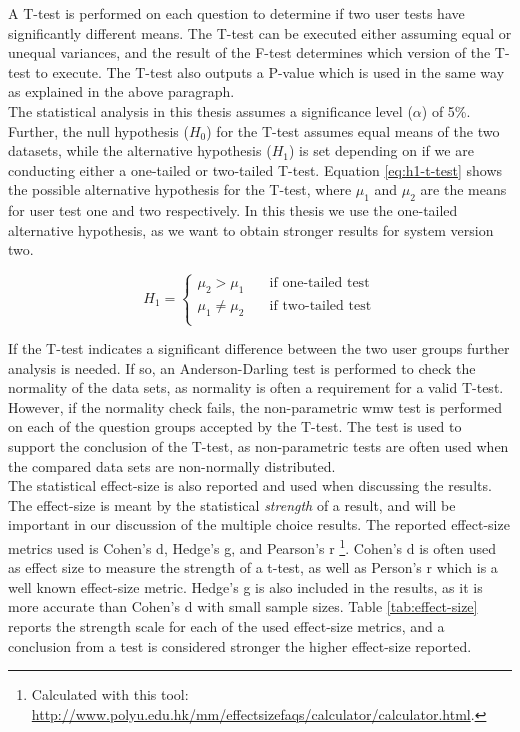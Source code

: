 A T-test \cite{walpole1993} is performed on each question to determine if two user tests have significantly different means. The T-test can be executed either assuming equal or unequal variances, and the result of the F-test determines which version of the T-test to execute. The T-test also outputs a P-value which is used in the same way as explained in the above paragraph. \\

The statistical analysis in this thesis assumes a significance level ($\alpha$) of 5\%. Further, the null hypothesis ($H_0$) for the T-test assumes equal means of the two datasets, while the alternative hypothesis ($H_1$) is set depending on if we are conducting either a one-tailed or two-tailed T-test. Equation \ref{eq:h1-t-test} shows the possible alternative hypothesis for the T-test, where $\mu_{1}$ and $\mu_{2}$ are the means for user test one and two respectively. In this thesis we use the one-tailed alternative hypothesis, as we want to obtain stronger results for system version two.

\begin{equation} \label{eq:h1-t-test}
   H_1 =
    \begin{cases}
        \mu_{2} > \mu_{1} & \quad \text{if one-tailed test}\\
        \mu_{1} \neq \mu_{2} & \quad \text{if two-tailed test}\\
    \end{cases}
\end{equation}

If the T-test indicates a significant difference between the two user groups further analysis is needed. If so, an Anderson-Darling test \cite{razali2011} is performed to check the normality of the data sets, as normality is often a requirement for a valid T-test. However, if the normality check fails, the non-parametric \gls{wmw} test \cite{hodges2005} is performed on each of the question groups accepted by the T-test. The test is used to support the conclusion of the T-test, as non-parametric tests are often used when the compared data sets are non-normally distributed. \\

The statistical effect-size is also reported and used when discussing the results. The effect-size is meant by the statistical \textit{strength} of a result, and will be important in our discussion of the multiple choice results. The reported effect-size metrics used is Cohen's d, Hedge's g, and Pearson's r \cite{cumming2013}\footnote{Calculated with this tool: \url{http://www.polyu.edu.hk/mm/effectsizefaqs/calculator/calculator.html}.}. Cohen's d is often used as effect size to measure the strength of a t-test, as well as Person's r which is a well known effect-size metric. Hedge's g is also included in the results, as it is more accurate than Cohen's d with small sample sizes. Table \ref{tab:effect-size} reports the strength scale for each of the used effect-size metrics, and a conclusion from a test is considered stronger the higher effect-size reported. \\

